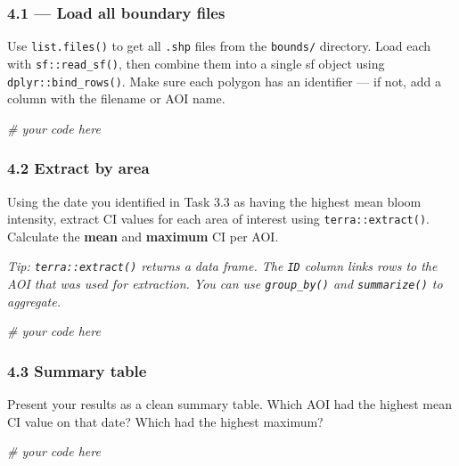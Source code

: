 \documentclass[
]{article}
\newenvironment{Shaded}{\begin{snugshade}}{\end{snugshade}}
\newcommand{\CommentTok}[1]{\textcolor[rgb]{0.56,0.35,0.01}{\textit{#1}}}
\begin{document}
\subsubsection{4.1 --- Load all boundary
files}\label{load-all-boundary-files}

Use \texttt{list.files()} to get all \texttt{.shp} files from the
\texttt{bounds/} directory. Load each with \texttt{sf::read\_sf()}, then
combine them into a single sf object using \texttt{dplyr::bind\_rows()}.
Make sure each polygon has an identifier --- if not, add a column with
the filename or AOI name.

\begin{Shaded}
\begin{Highlighting}[]
\CommentTok{\# your code here}
\end{Highlighting}
\end{Shaded}

\subsubsection{4.2 Extract by area}\label{extract-by-area}

Using the date you identified in Task 3.3 as having the highest mean
bloom intensity, extract CI values for each area of interest using
\texttt{terra::extract()}. Calculate the \textbf{mean} and
\textbf{maximum} CI per AOI.

\emph{Tip: \texttt{terra::extract()} returns a data frame. The
\texttt{ID} column links rows to the AOI that was used for extraction.
You can use \texttt{group\_by()} and \texttt{summarize()} to aggregate.}

\begin{Shaded}
\begin{Highlighting}[]
\CommentTok{\# your code here}
\end{Highlighting}
\end{Shaded}

\subsubsection{4.3 Summary table}\label{summary-table}

Present your results as a clean summary table. Which AOI had the highest
mean CI value on that date? Which had the highest maximum?

\begin{Shaded}
\begin{Highlighting}[]
\CommentTok{\# your code here}
\end{Highlighting}
\end{Shaded}
\end{document}
